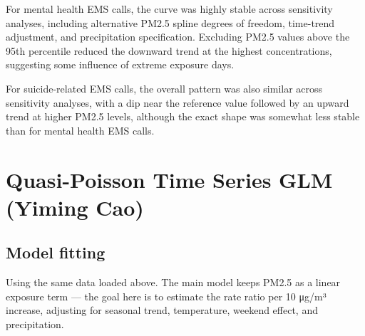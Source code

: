 \documentclass[
]{article}
\begin{document}
For mental health EMS calls, the curve was highly stable across
sensitivity analyses, including alternative PM2.5 spline degrees of
freedom, time-trend adjustment, and precipitation specification.
Excluding PM2.5 values above the 95th percentile reduced the downward
trend at the highest concentrations, suggesting some influence of
extreme exposure days.

For suicide-related EMS calls, the overall pattern was also similar
across sensitivity analyses, with a dip near the reference value
followed by an upward trend at higher PM2.5 levels, although the exact
shape was somewhat less stable than for mental health EMS calls.

\section{Quasi-Poisson Time Series GLM (Yiming
Cao)}\label{quasi-poisson-time-series-glm-yiming-cao}

\subsection{Model fitting}\label{model-fitting}

Using the same data loaded above. The main model keeps PM2.5 as a linear
exposure term --- the goal here is to estimate the rate ratio per 10
μg/m³ increase, adjusting for seasonal trend, temperature, weekend
effect, and precipitation.
\end{document}
